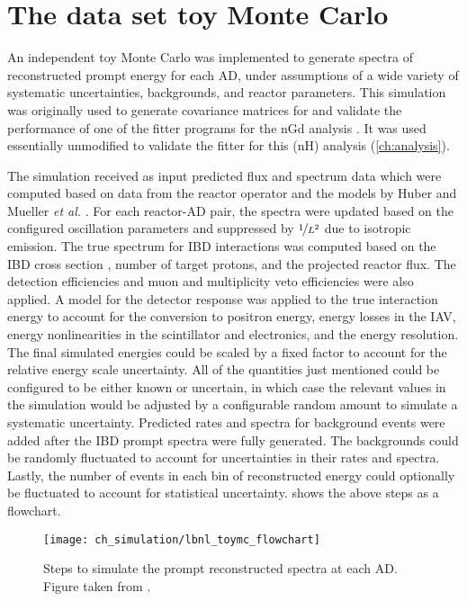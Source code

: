 \section{The data set toy Monte Carlo}
\label{sec:lbnl_toymc}

An independent toy Monte Carlo was implemented
to generate spectra of reconstructed prompt energy for each AD,
under assumptions of a wide variety of systematic uncertainties,
backgrounds, and reactor parameters.
This simulation was originally \cite{lbnl_toymc,p12e_fitter,p14a_fitter} used to generate covariance matrices for
and validate the performance of
one of the fitter programs for the nGd analysis
\cite[Method A of][]{ngd2016}.
It was used essentially unmodified to validate the fitter for this (nH) analysis
(\cref{ch:analysis}).

The simulation received as input predicted \nuebar{} flux and spectrum data
which were computed \cite{christine_reactor} based on data from the reactor operator
and the models by Huber \cite{reactor_huber}
and Mueller \emph{et al.} \cite{reactor_mueller}.
For each reactor-AD pair, the spectra were updated
based on the configured oscillation parameters
and suppressed by $\nicefrac{1}{L^2}$ due to isotropic emission.
The true \nuebar{} spectrum for IBD interactions was computed
based on the IBD cross section \cite{ibd_xsec,ibd_xsec_note},
number of target protons, and the projected reactor flux.
The detection efficiencies and muon and multiplicity veto efficiencies
were also applied.
A model for the detector response was applied to the true interaction energy
to account for the conversion to positron energy,
energy losses in the IAV,
energy nonlinearities in the scintillator and electronics,
and the energy resolution.
The final simulated energies could be scaled by a fixed factor
to account for the relative energy scale uncertainty.
All of the quantities just mentioned could be configured
to be either known or uncertain, in which case
the relevant values in the simulation would be
adjusted by a configurable random amount
to simulate a systematic uncertainty.
Predicted rates and spectra for background events
were added after the IBD prompt spectra were fully generated.
The backgrounds could be randomly fluctuated to account for
uncertainties in their rates and spectra.
Lastly, the number of events in each bin of reconstructed energy
could optionally be fluctuated to account for statistical uncertainty.
 shows the above steps as a flowchart.

\begin{figure}
    \texttt{[image: ch\_simulation/lbnl\_toymc\_flowchart]}
    \caption{
        Steps to simulate the prompt reconstructed spectra
        at each AD.
        Figure taken from \cite{lbnl_toymc}.
    }
    \label{fig:lbnl_toymc_flowchart}
\end{figure}

